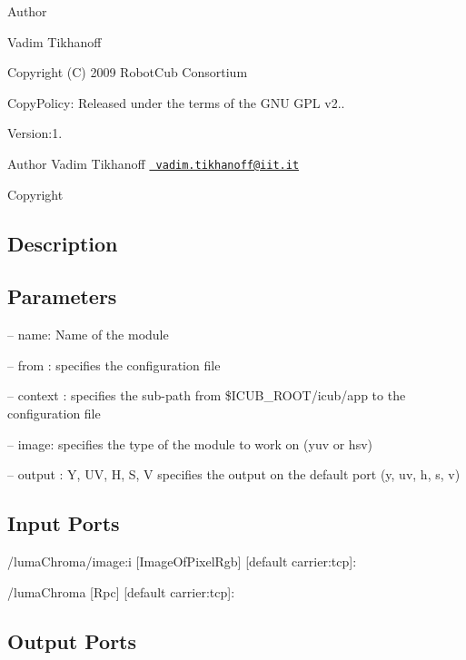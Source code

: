 \begin{DoxyAuthor}{Author}

\end{DoxyAuthor}
Vadim Tikhanoff

Copyright (C) 2009 Robot\+Cub Consortium

Copy\+Policy\+: Released under the terms of the G\+NU G\+PL v2..

Version\+:1. \begin{DoxyAuthor}{Author}
Vadim Tikhanoff \href{mailto:vadim.tikhanoff@iit.it}{\texttt{ vadim.\+tikhanoff@iit.\+it}} ~\newline
 
\end{DoxyAuthor}
\begin{DoxyCopyright}{Copyright}

\end{DoxyCopyright}
\hypertarget{group__seg2cloud_intro_sec}{}\subsection{Description}\label{group__seg2cloud_intro_sec}
\hypertarget{group__seg2cloud_parameters_sec}{}\subsection{Parameters}\label{group__seg2cloud_parameters_sec}

\begin{DoxyItemize}
\item -- name\+: Name of the module
\item -- from \+: specifies the configuration file
\item -- context \+: specifies the sub-\/path from {\ttfamily \$\+I\+C\+U\+B\+\_\+\+R\+O\+OT/icub/app} to the configuration file
\item -- image\+: specifies the type of the module to work on (yuv or hsv)
\item -- output \+: Y, UV, H, S, V specifies the output on the default port (y, uv, h, s, v) 
\end{DoxyItemize}\hypertarget{group__seg2cloud_inputports_sec}{}\subsection{Input Ports}\label{group__seg2cloud_inputports_sec}

\begin{DoxyItemize}
\item /luma\+Chroma/image\+:i \mbox{[}Image\+Of\+Pixel\+Rgb\mbox{]} \mbox{[}default carrier\+:tcp\mbox{]}\+:
\item /luma\+Chroma \mbox{[}Rpc\mbox{]} \mbox{[}default carrier\+:tcp\mbox{]}\+:
\end{DoxyItemize}\hypertarget{group__seg2cloud_outputports_sec}{}\subsection{Output Ports}\label{group__seg2cloud_outputports_sec}

